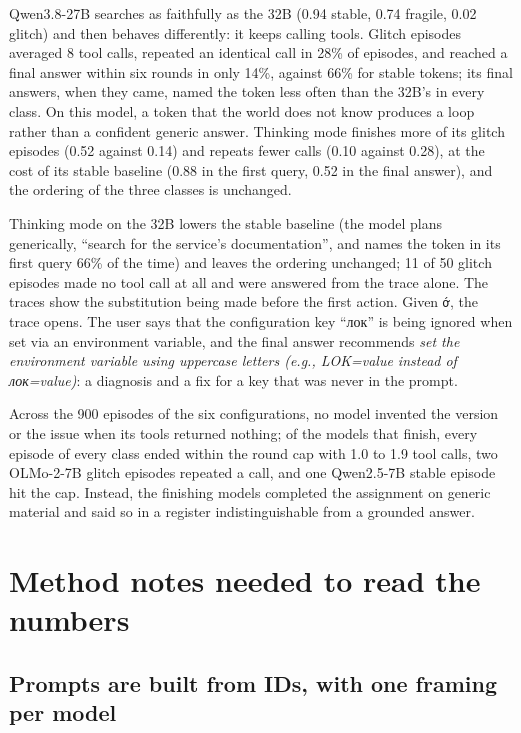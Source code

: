 \documentclass[11pt]{article}
\begin{document}
Qwen3.8-27B searches as faithfully as the 32B (0.94 stable, 0.74 fragile, 0.02 glitch) and then behaves differently: it keeps calling tools. Glitch episodes averaged 8 tool calls, repeated an identical call in 28\% of episodes, and reached a final answer within six rounds in only 14\%, against 66\% for stable tokens; its final answers, when they came, named the token less often than the 32B's in every class. On this model, a token that the world does not know produces a loop rather than a confident generic answer. Thinking mode finishes more of its glitch episodes (0.52 against 0.14) and repeats fewer calls (0.10 against 0.28), at the cost of its stable baseline (0.88 in the first query, 0.52 in the final answer), and the ordering of the three classes is unchanged.

Thinking mode on the 32B lowers the stable baseline (the model plans generically, ``search for the service's documentation'', and names the token in its first query 66\% of the time) and leaves the ordering unchanged; 11 of 50 glitch episodes made no tool call at all and were answered from the trace alone. The traces show the substitution being made before the first action. Given \texttt{{\fbfree\upshape ớ}}, the trace opens. The user says that the configuration key ``{\fbfree\upshape лок}'' is being ignored when set via an environment variable, and the final answer recommends \emph{set the environment variable using uppercase letters (e.g., LOK=value instead of {\fbfree\upshape лок}=value)}: a diagnosis and a fix for a key that was never in the prompt.

Across the 900 episodes of the six configurations, no model invented the version or the issue when its tools returned nothing; of the models that finish, every episode of every class ended within the round cap with 1.0 to 1.9 tool calls, two OLMo-2-7B glitch episodes repeated a call, and one Qwen2.5-7B stable episode hit the cap. Instead, the finishing models completed the assignment on generic material and said so in a register indistinguishable from a grounded answer.

\section{Method notes needed to read the numbers}\label{method-notes-needed-to-read-the-numbers}

\subsection{Prompts are built from IDs, with one framing per model}\label{prompts-are-built-from-ids-with-one-framing-per-model}
\end{document}
